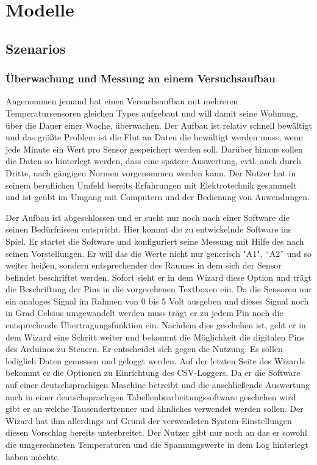 \chapter{Modelle}
\section{Szenarios}
\subsection{Überwachung und Messung an einem Versuchsaufbau}
Angenommen jemand hat einen Versuchsaufbau mit mehreren Temperatursensoren gleichen Types aufgebaut und will damit seine Wohnung, über die Dauer einer Woche, überwachen. Der Aufbau ist relativ schnell bewältigt und das größte Problem ist die Flut an Daten die bewältigt werden muss, wenn jede Minute ein Wert pro Sensor gespeichert werden soll. Darüber hinaus sollen die Daten so hinterlegt werden, dass eine spätere Auswertung, evtl. auch durch Dritte, nach gängigen Normen vorgenommen werden kann. Der Nutzer hat in seinem beruflichen Umfeld bereits Erfahrungen mit Elektrotechnik gesammelt und ist geübt im Umgang mit Computern und der Bedienung von Anwendungen.

Der Aufbau ist abgeschlossen und er sucht nur noch nach einer Software die seinen Bedürfnissen entspricht. Hier kommt die zu entwickelnde Software ins Spiel. Er startet die Software und konfiguriert  seine Messung mit Hilfe des  nach seinen Vorstellungen. Er will das die Werte nicht nur generisch "A1", "`A2"' und so weiter heißen, sondern entsprechender des Raumes in dem sich der Sensor befindet beschriftet werden. Sofort sieht er in dem Wizard diese Option und trägt die Beschriftung der Pins in die vorgesehenen Textboxen ein. Da die Sensoren nur ein analoges Signal im Rahmen von 0 bis 5 Volt ausgeben und dieses Signal noch in Grad Celsius umgewandelt werden muss trägt er zu jedem Pin noch die entsprechende Übertragungsfunktion ein. Nachdem dies geschehen ist, geht er in dem Wizard eine Schritt weiter und bekommt die Möglichkeit die digitalen Pins des Arduinos zu Steuern. Er entscheidet sich gegen die Nutzung. Es sollen lediglich Daten gemessen und geloggt werden. Auf der letzten Seite des Wizards bekommt er die Optionen zu Einrichtung des \acrshort{CSV}-Loggers. Da er die Software auf einer deutschsprachigen Maschine betreibt und die anschließende Auswertung auch in einer deutschsprachigen Tabellenbearbeitungssoftware geschehen wird gibt er an welche Tausendertrenner und ähnliches verwendet werden sollen. Der Wizard hat ihm allerdings auf Grund der verwendeten System-Einstellungen diesen Vorschlag bereits unterbreitet. Der Nutzer gibt nur noch an das er sowohl die umgerechneten Temperaturen und die Spannungswerte in dem Log hinterlegt haben möchte. 

